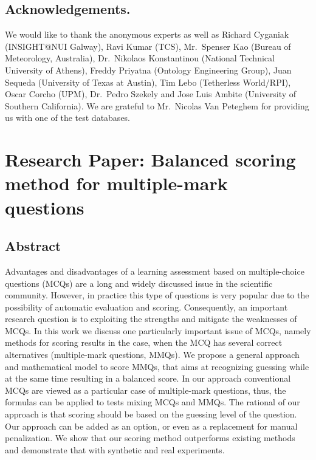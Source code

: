 \section*{Acknowledgements.}
We would like to thank the anonymous experts as well as Richard Cyganiak (INSIGHT@NUI Galway), Ravi Kumar (TCS), Mr.\ Spenser Kao (Bureau of Meteorology, Australia), Dr.\ Nikolaos Konstantinou (National Technical University of Athens), Freddy Priyatna (Ontology Engineering Group), Juan Sequeda (University of Texas at Austin), Tim Lebo (Tetherless World/RPI), Oscar Corcho (UPM), Dr.\ Pedro Szekely and Jose Luis Ambite (University of Southern California).
We are grateful to Mr.\ Nicolas Van Peteghem for providing us with one of the test databases.


\chapter{Research Paper: Balanced scoring method for multiple-mark questions}
\label{sec:app_balanced}

\section{Abstract}
Advantages and disadvantages of a learning assessment based on multiple-choice questions (MCQs) are a long and widely discussed issue in the scientific community.
However, in practice this type of questions is very popular due to the possibility of automatic evaluation and scoring.
Consequently, an important research question is to exploiting the strengths and mitigate the weaknesses of MCQs.
In this work we discuss one particularly important issue of MCQs, namely methods for scoring results in the case, when the MCQ has several correct alternatives (multiple-mark questions, MMQs).
We propose a general approach and mathematical model to score MMQs, that aims at recognizing guessing while at the same time resulting in a balanced score.
In our approach conventional MCQs are viewed as a particular case of multiple-mark questions, thus, the formulas can be applied to tests mixing MCQs and MMQs.
The rational of our approach is that scoring should be based on the guessing level of the question.
Our approach can be added as an option, or even as a replacement for manual penalization.
We show that our scoring method outperforms existing methods and demonstrate that with synthetic and real experiments.

